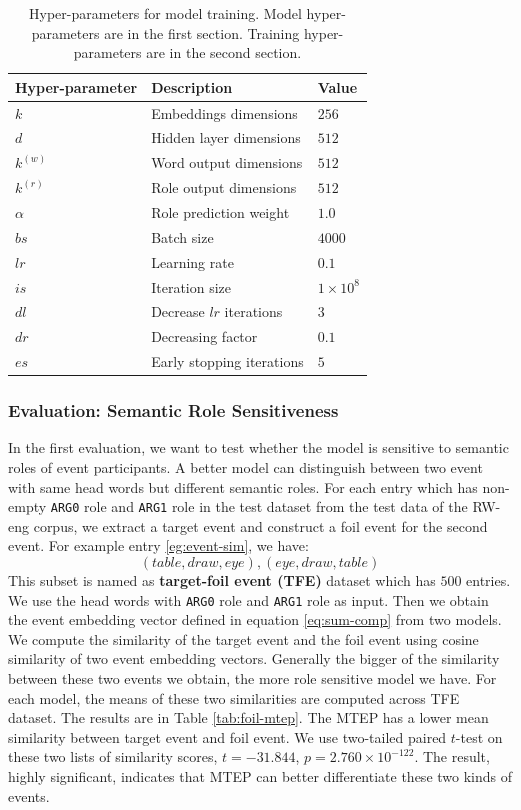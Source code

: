 \documentclass[a4paper]{article}
\begin{document}
\begin{table}[t]
\centering
\begin{tabular}{lll}
\textbf{Hyper-parameter} &  \textbf{Description}  &   \textbf{Value}  \\ \hline
$k$     & Embeddings dimensions   & $256$   \\
$d$     & Hidden layer dimensions & $512$   \\
$k^{(w)}$ & Word output dimensions  & $512$   \\
$k^{(r)}$ & Role output dimensions  & $512$   \\  \hline
$\alpha$  & Role prediction weight  & $1.0$   \\
$bs$    & Batch size        & $4000$    \\
$lr$    & Learning rate       & $0.1$   \\
$is$    & Iteration size      & $1 \times 10^8$ \\
$dl$    &   Decrease $lr$ iterations  & $3$   \\
$dr$    &   Decreasing factor     & $0.1$   \\
$es$    &   Early stopping iterations   & $5$   \\
\end{tabular}
\caption{\label{tab:hyper} Hyper-parameters for model training. Model hyper-parameters are in the first section. Training hyper-parameters are in the second section.}
\end{table}


\subsubsection{Evaluation: Semantic Role Sensitiveness} \label{sec:comp-srs}
In the first evaluation, we want to test whether the model is sensitive to semantic roles of event participants. A better model can distinguish between two event with same head words but different semantic roles. For each entry which has non-empty \texttt{ARG0} role and \texttt{ARG1} role in the test dataset from the test data of the RW-eng corpus, we extract a target event and construct a foil event for the second event. For example entry \eqref{eg:event-sim}, we have:
\begin{equation}
  (table, draw, eye), (eye, draw, table)
\end{equation}
This subset is named as \textbf{target-foil event (TFE)} dataset which has $500$ entries. We use the head words with \texttt{ARG0} role and \texttt{ARG1} role as input. Then we obtain the event embedding vector defined in equation  \eqref{eq:sum-comp} from two models. We compute the similarity of the target event and the foil event using cosine similarity of two event embedding vectors. Generally the bigger of the similarity between these two events we obtain, the more role sensitive model we have. For each model, the means of these two similarities are computed across TFE dataset. The results are in Table \ref{tab:foil-mtep}. The MTEP has a lower mean similarity between target event and foil event. We use two-tailed paired $t$-test on these two lists of similarity scores, $t=-31.844$, $p=2.760 \times 10^{-122}$. The result,  highly significant, indicates that MTEP can better differentiate these two kinds of events. 
\end{document}
